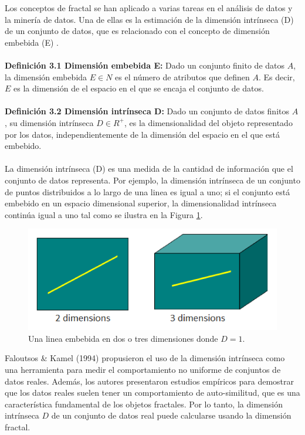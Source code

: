 Los conceptos de fractal se han aplicado a varias tareas en el análisis de datos y la minería de datos. Una de ellas es la estimación de la dimensión intrínseca (D) de un conjunto de datos, que es relacionado  con el concepto de dimensión embebida (E) \cite{conf/pods/FaloutsosK94}.
\\\\
\textbf{Definición 3.1 Dimensión embebida  E:} Dado un conjunto finito de datos $A$, la  
dimensión embebida $E \in N$ es el número de atributos que definen $A$. Es decir, $E$ es la dimensión de el espacio en el que se encaja el conjunto de datos.
\\\\
\textbf{Definición 3.2 Dimensión intrínseca D:} Dado un conjunto de datos finitos $A$, su dimensión intrínseca
$D \in R^+$, es la dimensionalidad del objeto representado por los datos, independientemente de la
dimensión del espacio en el que está embebido.
\\\\
La dimensión intrínseca (D) es una medida de la cantidad de información que el conjunto de datos representa. Por ejemplo, la dimensión intrínseca de un conjunto de puntos distribuidos a lo largo de una linea  es igual a uno; si el conjunto está embebido  en un espacio dimensional superior, la dimensionalidad intrínseca   continúa igual a uno tal como se ilustra en la Figura \ref{fig:ima3}.

\begin{figure}[h]
\centering
\includegraphics[scale=1.2]{chapter4/ima3.png}
\caption{Una linea embebida en dos o tres dimensiones donde $D=1$.}
\label{fig:ima3}
\end{figure}


Faloutsos & Kamel (1994) \cite{conf/pods/FaloutsosK94} propusieron el uso de la dimensión intrínseca como una herramienta para medir el comportamiento no uniforme de conjuntos de datos reales. Además, los autores presentaron estudios empíricos para demostrar que los datos reales suelen tener un comportamiento de auto-similitud, que es  una   característica fundamental de los objetos fractales. Por lo tanto, la dimensión intrínseca $D$ de un conjunto de datos real puede calcularse usando la dimensión fractal.

